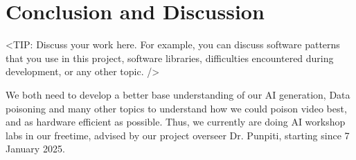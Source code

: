 \chapter{Conclusion and Discussion}
\label{chap:conclusion-discussion}

<TIP: Discuss your work here. For example, you can discuss software patterns
that you use in this project, software libraries, difficulties encountered during
development, or any other topic. />

We both need to develop a better base understanding of our AI generation, Data poisoning and many other topics to understand how we could poison video best, and as hardware efficient as possible.
Thus, we currently are doing AI workshop labs in our freetime, advised by our project overseer Dr. Punpiti, starting since 7 January 2025.